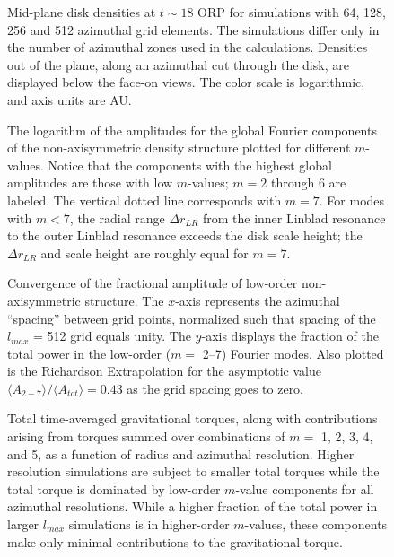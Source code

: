 \documentclass[manuscript]{aastex}
\begin{document}
\begin{figure}
\caption
{
Mid-plane disk densities at $t \sim 18$ ORP for simulations with 64, 128, 256 and 512 azimuthal grid elements.
The simulations differ only in the number of  azimuthal zones used in the calculations.  Densities out of the plane, along an azimuthal cut through the disk, are displayed below the face-on views.  The color scale is logarithmic, and axis units are AU. 
}
\label{fig:DensityPlots}
\end{figure}
\newpage

\begin{figure}
\caption
{
The logarithm of the amplitudes for the global Fourier components of the non-axisymmetric density structure plotted for
different $m$-values. Notice that the components with the highest global amplitudes are those with low $m$-values; $m=2$
through 6 are labeled.  The vertical dotted line corresponds with $m=7$.  For modes with $m < 7$,  the radial range
$\Delta r_{LR}$ from  the inner Linblad resonance to the outer Linblad resonance exceeds the disk scale height; the
$\Delta r_{LR}$ and scale height are roughly equal for $m = 7$.
}
\label{fig:Am_vs_log_m}
\end{figure}

\begin{figure}
\caption
{
Convergence of the fractional amplitude of low-order non-axisymmetric structure.  The $x$-axis represents
the azimuthal ``spacing'' between grid points,  normalized such that spacing of the $l_{max}$ = 512 grid
equals unity.
The $y$-axis displays the fraction of the total power in the low-order ($m = $ 2--7) Fourier modes. 
Also plotted is the Richardson Extrapolation for the asymptotic value  
$\langle A_{2-7} \rangle / \langle A_{tot} \rangle = 0.43$ as the grid spacing goes to zero.  
}
\label{fig:Power_Extrap}
\end{figure}

\begin{figure}
\caption
{
Total time-averaged gravitational  torques, along with contributions arising from torques
summed over combinations of  $m = $ 1, 2, 3, 4, and 5,
as a function of radius and azimuthal resolution. 
Higher resolution simulations are subject to smaller total torques while the total torque is dominated by low-order $m$-value
components for all azimuthal resolutions.  While a higher fraction of the total power in larger $l_{max}$ simulations is in higher-order $m$-values, these components make only minimal contributions to the gravitational torque. 
}
\label{fig:torquearray}
\end{figure}
\end{document}
